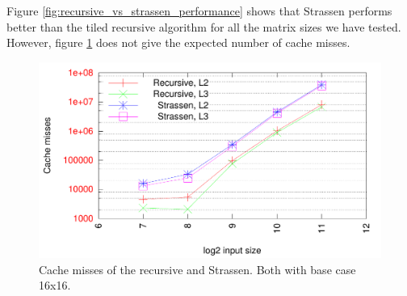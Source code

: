 Figure \ref{fig:recursive_vs_strassen_performance} shows that Strassen performs better than the tiled recursive algorithm for all the matrix sizes we have tested. However, figure \ref{fig:recursive_vs_strassen_cache} does not give the expected number of cache misses. 

\begin{figure}[h!]
  \centering
  \includegraphics[width=\textwidth]{"../project2/gnuplots/recursive_vs_strassen_cache"}
  \caption{Cache misses of the recursive and Strassen. Both with base case 16x16.}
  \label{fig:recursive_vs_strassen_cache}
\end{figure}




